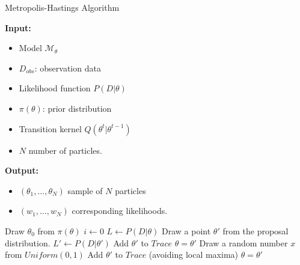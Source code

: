\begin{algorithm}[H]
    \caption{Metropolis-Hastings Algorithm}
    \label{alg:mh}
    \hspace*{\algorithmicindent} \textbf{Input:}
    \begin{itemize}
        \item Model $\mathcal{M}_\theta$
        \item $D_{obs}$: observation data
        \item Likelihood function $P(D|\theta)$
        \item $\pi(\theta)$: prior distribution
        \item Transition kernel $Q(\theta^t|\theta^{t-1})$
        \item $N$ number of particles.
    \end{itemize}
    \hspace*{\algorithmicindent} \textbf{Output:}
    \begin{itemize}
        \item $(\theta_1,\ldots,\theta_N)$ sample of $N$ particles
        \item $(w_1,\ldots,w_N)$ corresponding likelihoods.
    \end{itemize}
    \begin{algorithmic}[1]
        \State Draw $\theta_0$ from $\pi(\theta)$
        \State $i \leftarrow 0$
        \State $L \leftarrow P(D|\theta)$
        \State Draw a point $\theta' $ from the proposal distribution.
        \State $L' \leftarrow P(D|\theta')$
        \State Add $\theta'$ to $Trace$
        \State $\theta = \theta'$
        \Else
        \State Draw a random number $x$ from $Uniform(0,1)$
        \State Add $\theta'$ to $Trace$ (avoiding local maxima)
        \State $\theta = \theta'$
        \EndIf
        \EndIf
        \EndWhile
        \EndProcedure
    \end{algorithmic}
\end{algorithm}

